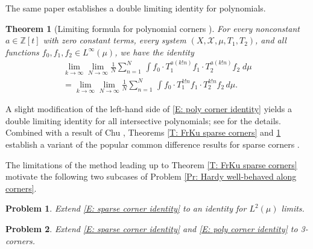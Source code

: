 \documentclass[11pt]{amsart}
\newtheorem{theorem}[lemma]{Theorem}
\newtheorem{problem}{Problem}
\theoremstyle{definition}
\newcommand{\Z}{{\mathbb Z}}
\newcommand{\CX}{{\mathcal X}}
\newcommand{\veps}{\varepsilon}
\newcommand{\1}{{\mathbf{1}}}
\begin{document}
The same paper establishes a double limiting identity for polynomials.
\begin{theorem}[Limiting formula for polynomial corners {\cite[Theorem 1.2]{FrKu25}}]\label{T: FrKu poly corners}
	For every nonconstant $a\in \Z[t]$ with zero constant terms, every system $(X,\CX,\mu,T_1,T_2)$, and all functions $f_0,f_1, f_2 \in L^\infty(\mu)$, we have the identity
 	\begin{multline}\label{E: poly corner identity}
 	 \lim_{k\to \infty}\lim_{N\to\infty}\frac{1}{N}\sum_{n=1}^N\,  \int f_0\cdot T_1^{a(k!n)}f_1\cdot T_2^{a(k!n)}f_2\; d\mu\\
     =\lim_{k\to \infty}\lim_{N\to\infty}\frac{1}{N}\sum_{n=1}^N\,  \int f_0\cdot T_1^{k!n}f_1\cdot T_2^{k!n}f_2\, d\mu.
 	\end{multline}
\end{theorem}
A slight modification of the left-hand side of \eqref{E: poly corner identity} yields a double limiting identity for all intersective polynomials; see \cite[Theorem 1.2]{FrKu25} for the details. Combined with a result of Chu \cite[Theorem 1.1]{Chu11}, Theorems \ref{T: FrKu sparse corners} and \ref{T: FrKu poly corners} establish a variant of the popular common difference results for sparse corners \cite[Theorems 1.4 and 1.5]{FrKu25}.

The limitations of the method leading up to Theorem \ref{T: FrKu sparse corners} motivate the following two subcases of Problem \ref{Pr: Hardy well-behaved along corners}.
\begin{problem}
    Extend \eqref{E: sparse corner identity} to an identity for $L^2(\mu)$ limits.
\end{problem}
\begin{problem}
    Extend \eqref{E: sparse corner identity} and \eqref{E: poly corner identity} to 3-corners. 
\end{problem}
\end{document}
